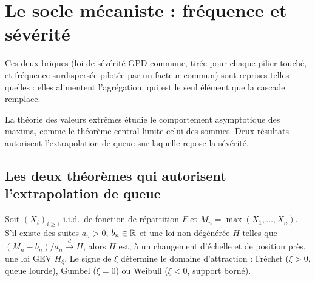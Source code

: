 \chapter{Le socle mécaniste : fréquence et sévérité}
\label{chap:socle}

\noindent Ces deux briques (loi de sévérité GPD commune, tirée pour chaque pilier touché, et
fréquence surdispersée pilotée par un facteur commun) sont reprises telles quelles : elles alimentent l'agrégation, qui est le
seul élément que la cascade remplace.


La théorie des valeurs extrêmes étudie le comportement asymptotique des maxima, comme le théorème
central limite celui des sommes. Deux résultats autorisent l'extrapolation de queue sur laquelle
repose la sévérité.

\section{Les deux théorèmes qui autorisent l'extrapolation de queue}

\begin{theorem}\label{soc:th:ftg}
Soit $(X_i)_{i\ge1}$ i.i.d.\ de fonction de répartition $F$ et $M_n=\max(X_1,\dots,X_n)$. S'il existe des suites $a_n>0$, $b_n\in\mathbb{R}$ et une loi non dégénérée $H$ telles que $(M_n-b_n)/a_n \xrightarrow{d} H$, alors $H$ est, à un changement d'échelle et de position près, une loi GEV $H_\xi$. Le signe de $\xi$ détermine le domaine d'attraction : Fréchet ($\xi>0$, queue lourde), Gumbel ($\xi=0$) ou Weibull ($\xi<0$, support borné).
\end{theorem}

